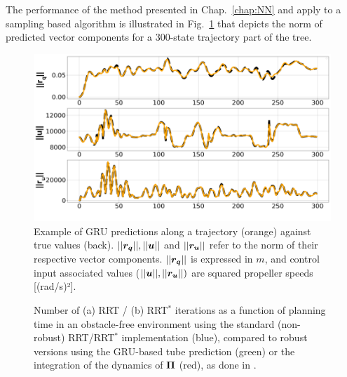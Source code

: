 The performance of the method presented in Chap.~\ref{chap:NN} and apply to a sampling based algorithm is illustrated in Fig.~\ref{fig: NN pred} that depicts the norm of predicted vector components for a 300-state trajectory part of the tree.


\begin{figure} [t]
    \centering
    \includegraphics[width=0.8\linewidth]{figures/robust_accurate/PredNorm.png} 
    \caption{Example of GRU predictions along a trajectory (orange) against true values (back). $||\boldsymbol{r_q}||, ||\boldsymbol{u}||$ and $||\boldsymbol{r_u}||$ refer to the norm of their respective vector components. $||\boldsymbol{r_q}||$ is expressed in $m$, and control input associated values ($||\boldsymbol{u}||,||\boldsymbol{r_u}||)$ are squared propeller speeds [(rad/s)²].}%
    \label{fig: NN pred}%
\end{figure}

\begin{figure} [!t]
    \centering
    \caption{Number of (a) RRT / (b) RRT$^*$ iterations as a function of planning time in an obstacle-free environment using the standard (non-robust) RRT/RRT$^*$ implementation (blue), compared to robust versions using the GRU-based tube prediction (green) or the integration of the dynamics of $\boldsymbol{\Pi}$ (red), as done in \cite{cSAMP}.}%
    \label{fig: NNTime}%
\end{figure}

